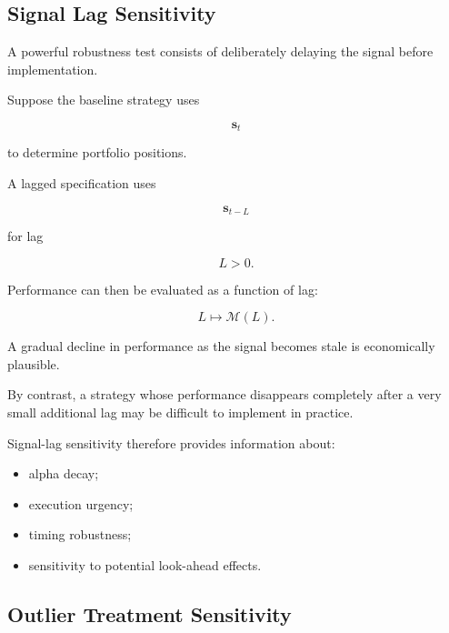 \documentclass[11pt,a4paper]{article}
\begin{document}
\subsection{Signal Lag Sensitivity}
\label{subsec:signal_lag_sensitivity}

A powerful robustness test consists of deliberately delaying the signal before
implementation.

Suppose the baseline strategy uses

\begin{equation}
\mathbf{s}_t
\end{equation}

to determine portfolio positions.

A lagged specification uses

\begin{equation}
\boxed{
\mathbf{s}_{t-L}
}
\end{equation}

for lag

\begin{equation}
L>0.
\end{equation}

Performance can then be evaluated as a function of lag:

\begin{equation}
\boxed{
L
\longmapsto
\mathcal{M}(L).
}
\end{equation}

A gradual decline in performance as the signal becomes stale is economically
plausible.

By contrast, a strategy whose performance disappears completely after a very
small additional lag may be difficult to implement in practice.

Signal-lag sensitivity therefore provides information about:

\begin{itemize}
    \item alpha decay;
    \item execution urgency;
    \item timing robustness;
    \item sensitivity to potential look-ahead effects.
\end{itemize}


\subsection{Outlier Treatment Sensitivity}
\label{subsec:outlier_treatment_sensitivity}
\end{document}
